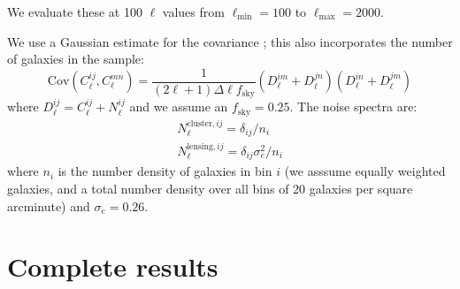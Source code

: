 \documentclass[twocolumn,twocolappendix]{aastex63}
\begin{document}
We evaluate these at 100 $\ell$ values from $\ell_\mathrm{min}=100$ to $\ell_\mathrm{max}=2000$.

We use a Gaussian estimate for the covariance \citep{takada_jain}; this also incorporates the number of galaxies in the
sample:
\begin{equation}
    \mathrm{Cov}(C^{ij}_\ell, C^{mn}_\ell) = \frac{1}{(2 \ell + 1)\Delta\ell f_\mathrm{sky}}(D^{im}_\ell + D^{jn}_\ell)(D^{in}_\ell + D^{jm}_\ell)
\end{equation}
where $D^{ij}_\ell = C^{ij}_\ell + N^{ij}_\ell$ and we assume an $f_\mathrm{sky}=0.25$.  The noise spectra are:
\begin{align}
N^{\mathrm{cluster},ij}_\ell = \delta_{ij} / n_i \\
N^{\mathrm{lensing},ij}_\ell = \delta_{ij} \sigma_e^2 / n_i
\end{align}
where $n_i$ is the number density of galaxies in bin $i$ (we asssume equally weighted galaxies, and a 
total number density over all bins of 20 galaxies per square arcminute) and $\sigma_e=0.26$.

\section{Complete results}
\label{sec:complete}
\end{document}
